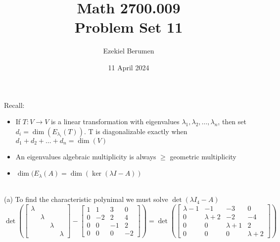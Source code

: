 \documentclass{report}
\title{\Huge{Math 2700.009}\\Problem Set 11}
\author{\huge{Ezekiel Berumen}}
\date{11 April 2024}
\begin{document}
\maketitle
\newpage

\begin{note}
Recall:
\begin{itemize}
\item If $T: V \rightarrow V$ is a linear transformation with eigenvalues $\lambda_1, \lambda_2, \ldots, \lambda_n$, then set $d_i=\operatorname{dim}(E_{\lambda_{i}}(T))$. T is diagonalizable exactly when $d_1 + d_2 + \ldots + d_n = \operatorname{dim}(V)$
\item An eigenvalues algebraic multiplicity is always $\ge$ geometric multiplicity
\item $\dim(E_\lambda(A) = \dim(\ker(\lambda I - A))$
\end{itemize}
\end{note}
\sol \\
(a) To find the characteristic polynimal we must solve $\operatorname{det}(\lambda I_4 - A)$
$$
\det\left(\begin{bmatrix}
\lambda&&&\\
&\lambda&&\\
&&\lambda&\\
&&&\lambda
\end{bmatrix} - \begin{bmatrix}
1&1&3&0\\
0&-2&2&4\\
0&0&-1&2\\
0&0&0&-2
\end{bmatrix}
\right) =
\det\left(
\begin{bmatrix}
\lambda-1&-1&-3&0\\
0&\lambda+2&-2&-4\\
0&0&\lambda+1&2\\
0&0&0&\lambda+2
\end{bmatrix}
\right)
$$
\end{document}
